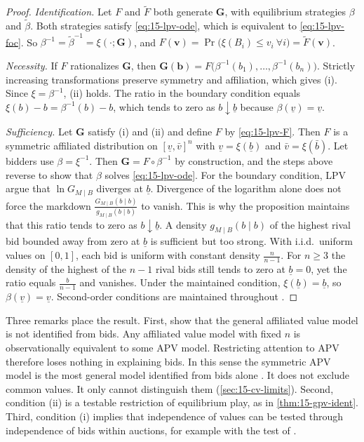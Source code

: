 \begin{proof}
\emph{Identification.} Let $F$ and $\tilde F$ both generate $\bm G$, with equilibrium strategies $\beta$ and
$\tilde\beta$. Both strategies satisfy \eqref{eq:15-lpv-ode}, which is equivalent to
\eqref{eq:15-lpv-foc}. So $\beta^{-1}=\tilde\beta^{-1}=\xi(\cdot;\bm G)$, and
$F(\bm v)=\Pr\bigl(\xi(B_i)\le v_i\ \forall i\bigr)=\tilde F(\bm v)$.

\emph{Necessity.} If $F$ rationalizes $\bm G$, then $\bm G(\bm b)=F\bigl(\beta^{-1}(b_1),\dots,\beta^{-1}(b_n)\bigr)$.
Strictly increasing transformations preserve symmetry and affiliation, which gives (i). Since
$\xi=\beta^{-1}$, (ii) holds. The ratio in the boundary condition equals $\xi(b)-b=\beta^{-1}(b)-b$, which tends to
zero as $b\downarrow\underline b$ because $\beta(\underline v)=\underline v$.

\emph{Sufficiency.} Let $\bm G$ satisfy (i) and (ii) and define $F$ by \eqref{eq:15-lpv-F}. Then $F$ is a
symmetric affiliated distribution on $[\underline v,\bar v]^n$ with
$\underline v=\xi(\underline b)$ and $\bar v=\xi(\bar b)$. Let bidders use $\beta=\xi^{-1}$. Then
$\bm G=F\circ\beta^{-1}$ by construction, and the steps above reverse to show that $\beta$ solves
\eqref{eq:15-lpv-ode}. For the boundary condition, LPV argue that $\ln G_{M\mid B}$ diverges at
$\underline b$. Divergence of the logarithm alone does not force the markdown
$\frac{G_{M\mid B}(b\mid b)}{g_{M\mid B}(b\mid b)}$ to vanish. This is why the proposition maintains
that this ratio tends to zero as $b\downarrow\underline b$. A density $g_{M\mid B}(b\mid b)$ of the highest rival
bid bounded away from zero at $\underline b$ is sufficient but too strong. With i.i.d.\ uniform values on $[0,1]$,
each bid is uniform with constant density $\frac{n}{n-1}$. For $n\ge3$ the density of the highest of the $n-1$
rival bids still tends to zero at $\underline b=0$, yet the ratio equals $\frac{b}{n-1}$ and vanishes. Under the maintained condition, $\xi(\underline b)=\underline b$, so
$\beta(\underline v)=\underline v$.
Second-order conditions are maintained throughout \citep[footnote~7]{LiPerrigneVuong2002}.
\end{proof}

Three remarks place the result. First, \citet{LaffontVuong1996} show that the general affiliated value
model is not identified from bids. Any affiliated value model with fixed $n$ is observationally equivalent
to some APV model. Restricting attention to APV therefore loses nothing in explaining bids. In this
sense the symmetric APV model is the most general model identified from bids alone
\citep[p.~175]{LiPerrigneVuong2002}. It does not exclude common values. It only cannot distinguish them
(\cref{sec:15-cv-limits}). Second, condition (ii) is a testable restriction of equilibrium play, as in
\cref{thm:15-gpv-ident}. Third, condition (i) implies that independence of values can be tested through
independence of bids within auctions, for example with the test of \citet{BlumKieferRosenblatt1961}.

